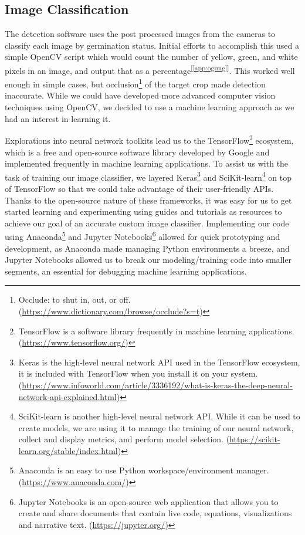 \documentclass[11pt, hidelinks]{report}
\newcommand{\refapp}[1]{\textsuperscript{[\ref{#1}]}}
\begin{document}
\subsection{Image Classification}
The detection software uses the post processed images from the cameras to classify each image by germination status. Initial efforts to accomplish this used a simple OpenCV script which would count the number of yellow, green, and white pixels in an image, and output that as a percentage\refapp{app:ogimg}. This worked well enough in simple cases, but occlusion\footnote{Occlude: to shut in, out, or off. (\url{https://www.dictionary.com/browse/occlude?s=t})} of the target crop made detection inaccurate. While we could have developed more advanced computer vision techniques using OpenCV, we decided to use a machine learning approach as we had an interest in learning it. 

Explorations into neural network toolkits lead us to the TensorFlow\footnote{TensorFlow is a software library frequently in machine learning applications. (\url{https://www.tensorflow.org/})} ecosystem, which is a free and open-source software library developed by Google and implemented frequently in machine learning applications. To assist us with the task of training our image classifier, we layered Keras\footnote{Keras is the high-level neural network API used in the TensorFlow ecosystem, it is included with TensorFlow when you install it on your system. (\url{https://www.infoworld.com/article/3336192/what-is-keras-the-deep-neural-network-api-explained.html})} and SciKit-learn\footnote{SciKit-learn is another high-level neural network API. While it can be used to create models, we are using it to manage the training of our neural network, collect and display metrics, and perform model selection. (\url{https://scikit-learn.org/stable/index.html})} on top of TensorFlow so that we could take advantage of their user-friendly APIs. Thanks to the open-source nature of these frameworks, it was easy for us to get started learning and experimenting using guides and tutorials as resources to achieve our goal of an accurate custom image classifier. Implementing our code using Anaconda\footnote{Anaconda is an easy to use Python workspace/environment manager. (\url{https://www.anaconda.com/})} and Jupyter Notebooks\footnote{Jupyter Notebooks is an open-source web application that allows you to create and share documents that contain live code, equations, visualizations and narrative text. (\url{https://jupyter.org/})} allowed for quick prototyping and development, as Anaconda made managing Python environments a breeze, and Jupyter Notebooks allowed us to break our modeling/training code into smaller segments, an essential for debugging machine learning applications. 
\end{document}
